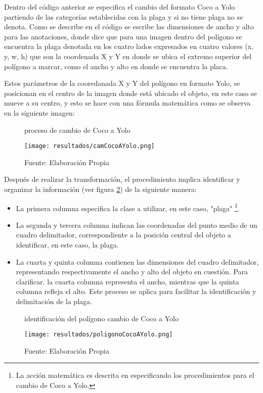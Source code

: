 Dentro del código anterior se especifica el cambio del formato Coco a Yolo partiendo de las categorías establecidas con la plaga y si no tiene plaga no se denota. Como se describe en el código se escribe las dimensiones de ancho y alto para las anotaciones, donde dice que para una imagen dentro del polígono se encuentra la plaga denotada en los cuatro lados expresados en cuatro valores (x, y, w, h) que son la coordenada X y Y en donde se ubica el extremo superior del polígono a marcar, como el ancho y alto en donde se encuentra la placa.

Estos parámetros de la cooredanada X y Y del polígono en formato Yolo, se posicionan en el centro de la imagen donde está ubicado el objeto, en este caso se mueve a su centro, y esto se hace con una fórmula matemática  como se observa en la siguiente imagen:


\begin{figure}[h]
\centering
\caption{proceso de cambio de Coco a Yolo}
\texttt{[image: resultados/camCocoAYolo.png]}
\caption*{\footnotesize Fuente: Elaboración Propia}
\label{fig:figuraCamCocoAYolo}
\end{figure}

\newpage

Después de realizar la transformación, el procedimiento implica identificar y organizar la información (ver figura \ref{fig:figuraPoligonoCocoAYolo}) de la siguiente manera:
\begin{itemize}
    \item La primera columna especifica la clase a utilizar, en este caso, "plaga" \footnote{La acción matemática es descrita en \cite{rehman2022conversion} especificando los procedimientos para el cambio de Coco a Yolo.}. 
    \item La segunda y tercera columna indican las coordenadas del punto medio de un cuadro delimitador, correspondiente a la posición central del objeto a identificar, en este caso, la plaga. 
    \item La cuarta y quinta columna contienen las dimensiones del cuadro delimitador, representando respectivamente el ancho y alto del objeto en cuestión. Para clarificar. la cuarta columna representa el ancho, mientras que la quinta columna refleja el alto. Este proceso se aplica para facilitar la identificación y delimitación de la plaga.
\end{itemize}

\begin{figure}[h]
\centering
\caption{identificación del polígono cambio de Coco a Yolo}
\texttt{[image: resultados/poligonoCocoAYolo.png]}
\caption*{\footnotesize Fuente: Elaboración Propia}
\label{fig:figuraPoligonoCocoAYolo}
\end{figure}

